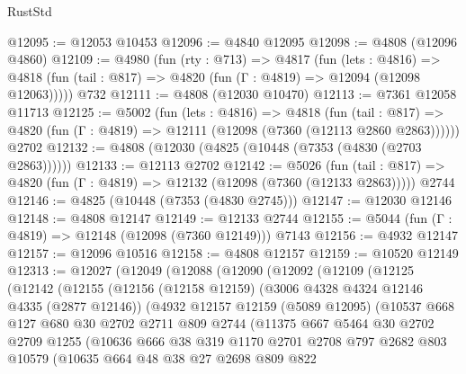 \begin{lexlean}{RustStd}
\begin{coremodule}
@12095 := @12053 @10453
@12096 := @4840 @12095
@12098 := @4808 (@12096 @4860)
@12109 := @4980
    (fun (rty : @713) =>
    @4817
      (fun (lets : @4816) =>
      @4818 (fun (tail : @817) => @4820 (fun (Γ : @4819) => @12094 (@12098 @12063)))))
    @732
@12111 := @4808 (@12030 @10470)
@12113 := @7361 @12058 @11713
@12125 := @5002
    (fun (lets : @4816) =>
    @4818
      (fun (tail : @817) =>
      @4820 (fun (Γ : @4819) => @12111 (@12098 (@7360 (@12113 @2860 @2863))))))
    @2702
@12132 := @4808 (@12030 (@4825 (@10448 (@7353 (@4830 (@2703 @2863))))))
@12133 := @12113 @2702
@12142 := @5026
    (fun (tail : @817) => @4820 (fun (Γ : @4819) => @12132 (@12098 (@7360 (@12133 @2863)))))
    @2744
@12146 := @4825 (@10448 (@7353 (@4830 @2745)))
@12147 := @12030 @12146
@12148 := @4808 @12147
@12149 := @12133 @2744
@12155 := @5044 (fun (Γ : @4819) => @12148 (@12098 (@7360 @12149))) @7143
@12156 := @4932 @12147
@12157 := @12096 @10516
@12158 := @4808 @12157
@12159 := @10520 @12149
@12313 := @12027
    (@12049
      (@12088
        (@12090
          (@12092
            (@12109
              (@12125
                (@12142
                  (@12155
                    (@12156
                      (@12158 @12159)
                      (@3006 @4328 @4324 @12146 @4335 (@2877 @12146))
                      (@4932
                        @12157
                        @12159
                        (@5089 @12095)
                        (@10537
                          @668
                          @127
                          @680
                          @30
                          @2702
                          @2711
                          @809
                          @2744
                          (@11375
                            @667
                            @5464
                            @30
                            @2702
                            @2709
                            @1255
                            (@10636
                              @666
                              @38
                              @319
                              @1170
                              @2701
                              @2708
                              @797
                              @2682
                              @803
                              @10579
                              (@10635
                                @664
                                @48
                                @38
                                @27
                                @2698
                                @809
                                @822

\end{coremodule}
\end{lexlean}
